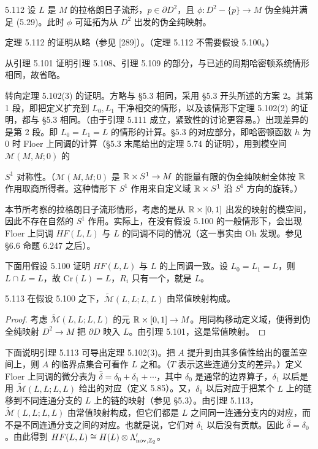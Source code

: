 \begin{theorem}{5.112}
  设 $L$ 是 $M$ 的拉格朗日子流形，$p\in\partial D^2$，且 $\phi\colon D^2-\{p\}\to M$ 伪全纯并满足 (5.29)。此时 $\phi$ 可延拓为从 $D^2$ 出发的伪全纯映射。
\end{theorem}

定理 5.112 的证明从略（参见 [289]）。（定理 5.112 不需要假设 5.100。）

从引理 5.101 证明引理 5.108、引理 5.109 的部分，与已述的周期哈密顿系统情形相同，故省略。

转向定理 5.102(3) 的证明。方略与 §5.3 相同，采用 §5.3 开头所述的方案 2。其第 1 段，即把定义扩充到 $L_0,L_1$ 干净相交的情形，以及该情形下定理 5.102(2) 的证明，都与 §5.3 相同。（由于引理 5.111 成立，紧致性的讨论更容易。）出现差异的是第 2 段。即 $L_0=L_1=L$ 的情形的计算。§5.3 的对应部分，即哈密顿函数 $h$ 为 0 时 Floer 上同调的计算（§5.3 末尾给出的定理 5.74 的证明），用到模空间 $\mathcal{M}(M,M;0)$ 的

$S^1$ 对称性。（$\mathcal{M}(M,M;0)$ 是 $\mathbb{R}\times S^1\to M$ 的能量有限的伪全纯映射全体按 $\mathbb{R}$ 作用取商所得者。这种情形下 $S^1$ 作用来自定义域 $\mathbb{R}\times S^1$ 沿 $S^1$ 方向的旋转。）

本节所考察的拉格朗日子流形情形，考虑的是从 $\mathbb{R}\times[0,1]$ 出发的映射的模空间，因此不存在自然的 $S^1$ 作用。实际上，在没有假设 5.100 的一般情形下，会出现 Floer 上同调 $HF(L,L)$ 与 $L$ 的同调不同的情况（这一事实由 Oh 发现。参见 §6.6 命题 6.247 之后）。

下面用假设 5.100 证明 $HF(L,L)$ 与 $L$ 的上同调一致。设 $L_0=L_1=L$，则 $L\cap L=L$，故 $\mathrm{Cr}(L)=L$，$R_i$ 只有一个，就是 $L$。

\begin{lemma*}{5.113}
  在假设 5.100 之下，$\tilde{\mathcal{M}}(L,L;L,L)$ 由常值映射构成。
\end{lemma*}

\begin{proof}
  考虑 $\tilde{\mathcal{M}}(L,L;L,L)$ 的元 $\mathbb{R}\times[0,1]\to M$。用同构移动定义域，便得到伪全纯映射 $D^2\to M$ 把 $\partial D$ 映入 $L$。由引理 5.101，这是常值映射。
\end{proof}

下面说明引理 5.113 可导出定理 5.102(3)。把 $A$ 提升到由其多值性给出的覆盖空间上，则 $A$ 的临界点集合可看作 $L$ 之和。（$T$ 表示这些连通分支的差异。）定义 Floer 上同调的微分表为 $\hat\delta=\delta_0+\delta_1+\cdots$，其中 $\delta_0$ 是通常的边界算子，$\delta_1$ 以后是用 $\tilde{\mathcal{M}}(L,L;L,L)$ 给出的对应（定义 5.85）。又，$\delta_1$ 以后对应于把某个 $L$ 上的链移到不同连通分支的 $L$ 上的链的映射（参见 §5.3）。由引理 5.113，$\tilde{\mathcal{M}}(L,L;L,L)$ 由常值映射构成，但它们都是 $L$ 之间同一连通分支内的对应，而不是不同连通分支之间的对应。也就是说，它们对 $\delta_1$ 以后没有贡献。因此 $\hat\delta=\delta_0$。由此得到 $HF(L,L)\cong H(L)\otimes\Lambda'_{\mathrm{nov},\mathbb{Z}_2}$。

